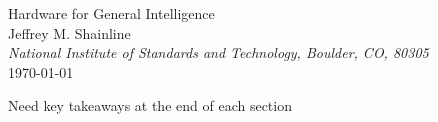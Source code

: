 \documentclass[]{article}
\begin{document}
    
\begin{center}
\LARGE{Hardware for General Intelligence}\\ 
\vspace{0.3em}
\large Jeffrey M. Shainline\\
\vspace{0.0em}
\textit{\small National Institute of Standards and Technology, Boulder, CO, 80305}\\
\vspace{0.3em}
\small \today

\begin{abstract}

\vspace{1em}
\end{abstract}

\end{center}

\begin{multicols}{2}

\setcounter{tocdepth}{3}
\setcounter{secnumdepth}{4}
\tableofcontents

\vspace{3em}
Need key takeaways at the end of each section
\vspace{3em}




















\end{multicols}
\end{document}
